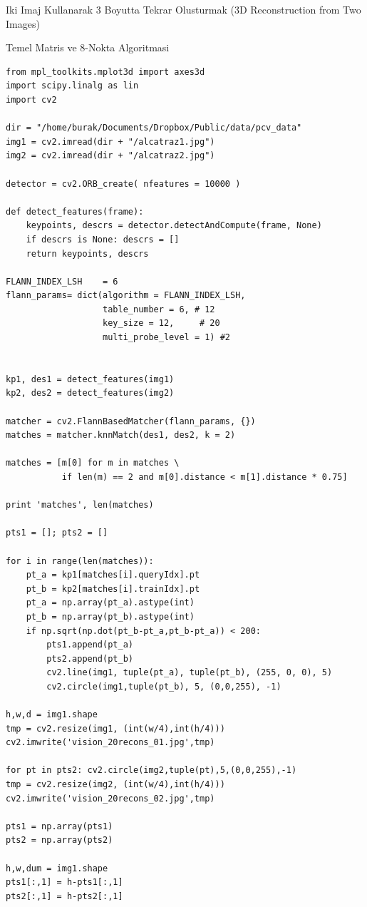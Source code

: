 \documentclass[12pt,fleqn]{article}\usepackage{../../common}
\begin{document}
Iki Imaj Kullanarak 3 Boyutta Tekrar Olusturmak (3D Reconstruction from Two Images)

Temel Matris ve 8-Nokta Algoritmasi 

\begin{verbatim}
from mpl_toolkits.mplot3d import axes3d
import scipy.linalg as lin
import cv2

dir = "/home/burak/Documents/Dropbox/Public/data/pcv_data"
img1 = cv2.imread(dir + "/alcatraz1.jpg")
img2 = cv2.imread(dir + "/alcatraz2.jpg")

detector = cv2.ORB_create( nfeatures = 10000 )

def detect_features(frame):
    keypoints, descrs = detector.detectAndCompute(frame, None)
    if descrs is None: descrs = []
    return keypoints, descrs

FLANN_INDEX_LSH    = 6
flann_params= dict(algorithm = FLANN_INDEX_LSH,
                   table_number = 6, # 12
                   key_size = 12,     # 20
                   multi_probe_level = 1) #2


kp1, des1 = detect_features(img1)
kp2, des2 = detect_features(img2)

matcher = cv2.FlannBasedMatcher(flann_params, {})
matches = matcher.knnMatch(des1, des2, k = 2)

matches = [m[0] for m in matches \
           if len(m) == 2 and m[0].distance < m[1].distance * 0.75]

print 'matches', len(matches)

pts1 = []; pts2 = []

for i in range(len(matches)):
    pt_a = kp1[matches[i].queryIdx].pt
    pt_b = kp2[matches[i].trainIdx].pt
    pt_a = np.array(pt_a).astype(int)
    pt_b = np.array(pt_b).astype(int)
    if np.sqrt(np.dot(pt_b-pt_a,pt_b-pt_a)) < 200:
        pts1.append(pt_a)
        pts2.append(pt_b)
        cv2.line(img1, tuple(pt_a), tuple(pt_b), (255, 0, 0), 5)
        cv2.circle(img1,tuple(pt_b), 5, (0,0,255), -1)

h,w,d = img1.shape
tmp = cv2.resize(img1, (int(w/4),int(h/4)))
cv2.imwrite('vision_20recons_01.jpg',tmp)

for pt in pts2: cv2.circle(img2,tuple(pt),5,(0,0,255),-1)
tmp = cv2.resize(img2, (int(w/4),int(h/4)))
cv2.imwrite('vision_20recons_02.jpg',tmp)

pts1 = np.array(pts1)
pts2 = np.array(pts2)

h,w,dum = img1.shape
pts1[:,1] = h-pts1[:,1]
pts2[:,1] = h-pts2[:,1]
\end{verbatim}
\end{document}

